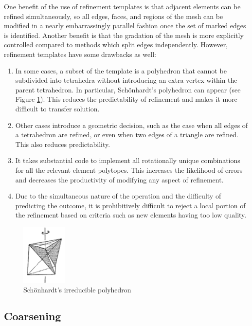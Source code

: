 One benefit of the use of refinement templates is that adjacent elements can be refined
simultaneously, so all edges, faces, and regions of the mesh can be modified in
a nearly embarrassingly parallel fashion once the set of marked edges is identified.
Another benefit is that the gradation of the mesh is more explicitly controlled
compared to methods which split edges independently.
However, refinement templates have some drawbacks as well:
\begin{enumerate}
\item In some cases, a subset of the template is a polyhedron that cannot be
subdivided into tetrahedra without introducing an extra vertex within the
parent tetrahedron.
In particular, Sch{\"o}nhardt's polyhedron can appear (see Figure
\ref{fig:schonhardt}).
This reduces the predictability of refinement and makes it more difficult
to transfer solution.
\item Other cases introduce a geometric decision, such as the case
when all edges of a tetrahedron are refined, or even when two edges
of a triangle are refined. This also reduces predictability.
\item It takes substantial code to implement all rotationally unique
combinations for all the relevant element polytopes.
This increases the likelihood of errors and decreases the productivity
of modifying any aspect of refinement.
\item Due to the simultaneous nature of the operation and the difficulty
of predicting the outcome, it is prohibitively difficult to reject
a local portion of the refinement based on criteria such as new elements
having too low quality.
\end{enumerate}

\begin{figure}
\begin{center}
\includegraphics[width=0.2\textwidth]{schonhardt.png}
\caption{Sch{\"o}nhardt's irreducible polyhedron
\cite{Schonhardt1928}}
\label{fig:schonhardt}
\end{center}
\end{figure}

\subsection{Coarsening}

